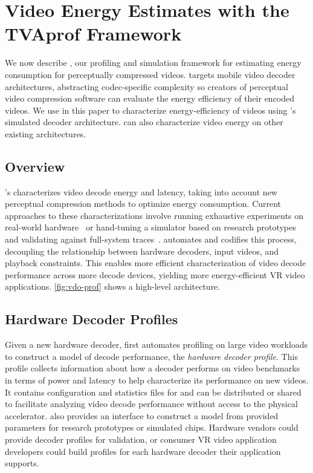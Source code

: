 \section{Video Energy Estimates with the TVAprof Framework}
\label{sec:vdoprof}

We now describe \nameArchprof, our profiling and simulation framework for estimating energy consumption for perceptually compressed videos.
\nameArchprof targets mobile video decoder architectures, abstracting codec-specific complexity so creators of perceptual video compression software can evaluate the energy efficiency of their encoded videos.
We use \nameArchprof in this paper to characterize energy-efficiency of videos using \nameArch's simulated decoder architecture. \nameArchprof can also characterize video energy on other existing architectures.


\subsection{\nameArchprof Overview}
\nameArchprof's characterizes video decode energy and latency, taking into account new perceptual compression methods to optimize energy consumption.
Current approaches to these characterizations involve running exhaustive experiments on real-world hardware~\cite{evr19isca} or hand-tuning a simulator based on research prototypes and validating against full-system traces~\cite{zhang2017race}.
\nameArchprof automates and codifies this process, decoupling the relationship between hardware decoders, input videos, and playback constraints.
This enables more efficient characterization of video decode performance across more decode devices, yielding more energy-efficient VR video applications.
\ref{fig:vdo-prof} shows a high-level \nameArchprof architecture.

\vdoprofOverview

\subsection{Hardware Decoder Profiles}
\label{subsec:profiles}

Given a new hardware decoder, \nameArchprof first automates profiling on large video workloads to construct a model of decode performance, the \emph{hardware decoder profile}.
This profile collects information about how a decoder performs on video benchmarks in terms of power and latency to help characterize its performance on new videos.
It contains configuration and statistics files for \nameArchprof and can be distributed or shared to facilitate analyzing video decode performance without access to the physical accelerator.
\nameArchprof also provides an interface to construct a model from provided parameters for research prototypes or simulated chips.
Hardware vendors could provide \nameArchprof decoder profiles for validation, or consumer VR video application developers could build profiles for each hardware decoder their application supports.

